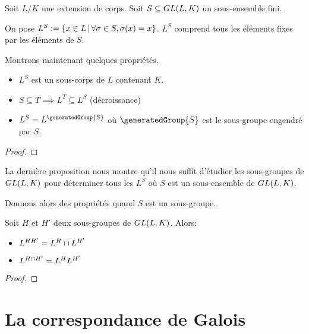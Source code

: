 \begin{definition}
	Soit $L/K$ une extension de corps.
	Soit $S \subseteq GL(L, K)$ un sous-ensemble fini.

	On pose $L^{S} := \left\{x \in L \, | \, \forall \sigma \in S, \sigma(x) = x \right\}$.
	$L^{S}$ comprend tous les éléments fixes par les éléments de $S$.
\end{definition}

Montrons maintenant quelques propriétés.

\begin{proposition}
	\begin{itemize}
		\item $L^{S}$ est un sous-corps de $L$ contenant $K$.
		\item $S \subseteq T \implies L^{T} \subseteq L^{S}$ (décroissance)
		\item $L^{S} = L^{\generatedGroup{S}}$ où $\generatedGroup{S}$ est le
			sous-groupe engendré par $S$.
	\end{itemize}
\end{proposition}

\ifdefined\outputproof
\begin{proof}

\end{proof}
\fi

La dernière proposition nous montre qu'il nous suffit d'étudier les sous-groupes
de $GL(L, K)$ pour déterminer tous les $L^{S}$ où $S$ est un
sous-ensemble de $GL(L, K)$.

Donnons alors des propriétés quand $S$ est un sous-groupe.

\begin{proposition}
	Soit $H$ et $H'$ deux sous-groupes de $GL(L, K)$. Alors:
	\begin{itemize}
		\item $L^{HH'} = L^{H} \cap L^{H'}$
		\item $L^{H \cap H'} = L^{H} L^{H'}$
	\end{itemize}
\end{proposition}

\ifdefined\outputproof
\begin{proof}

\end{proof}
\fi

\section{La correspondance de Galois}

